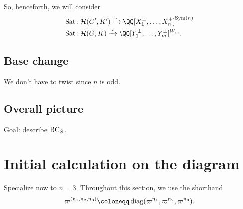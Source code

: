 So, henceforth, we will consider
\begin{align*}
  \Sat &\colon \HH(G', K') \xrightarrow{\sim}\QQ[X_1^\pm, \dots, X_n^\pm]^{\Sym(n)} \\
  \Sat &\colon \HH(G, K)\xrightarrow{\sim} \QQ[Y_1^{\pm}, \dots, Y_m^{\pm}]^{W_m}.
\end{align*}

\subsection{Base change}

We don't have to twist since $n$ is odd.

\subsection{Overall picture}
\begin{center}
\end{center}
Goal: describe $\operatorname{BC}_S$.


\section{Initial calculation on the diagram}
Specialize now to $n=3$.
Throughout this section, we use the shorthand
\[ \varpi^{(n_1, n_2, n_3)} \coloneqq \diag(\varpi^{n_1}, \varpi^{n_2}, \varpi^{n_3}). \]

